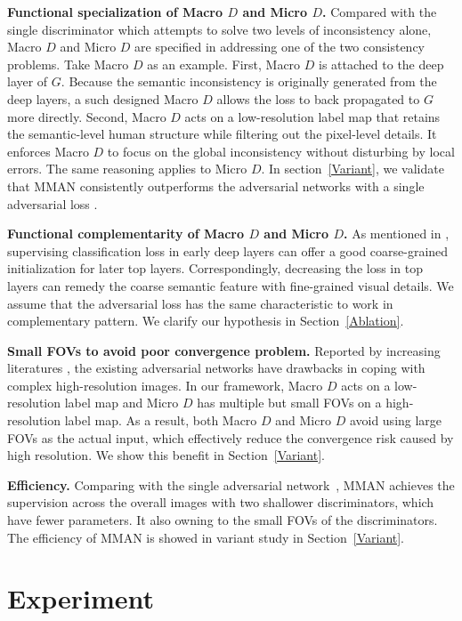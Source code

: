 \documentclass[runningheads]{llncs}
\begin{document}
\textbf{Functional specialization of Macro $D$ and Micro $D$.} Compared with the single discriminator which attempts to solve two levels of inconsistency alone, Macro $D$ and Micro $D$ are specified in addressing one of the two consistency problems. Take Macro $D$ as an example. First, Macro $D$ is attached to the deep layer of $G$. Because the semantic inconsistency is originally generated from the deep layers, a such designed Macro $D$ allows the loss to back propagated to $G$ more directly. Second, Macro $D$ acts on a low-resolution label map that retains the semantic-level human structure while filtering out the pixel-level details. It enforces Macro $D$ to focus on the global inconsistency without disturbing by local errors. The same reasoning applies to Micro $D$. In section~\ref{Variant}, we validate that MMAN consistently outperforms the adversarial networks with a single adversarial loss \cite{luc2016semantic,dai2017scan}.

\textbf{Functional complementarity of Macro $D$ and Micro $D$.} As mentioned in \cite{xue2017segan}, supervising classification loss in early deep layers can offer a good coarse-grained initialization for later top layers. Correspondingly, decreasing the loss in top layers can remedy the coarse semantic feature with fine-grained visual details. We assume that the adversarial loss has the same characteristic to work in complementary pattern. We clarify our hypothesis in Section~\ref{Ablation}.

\textbf{Small FOVs to avoid poor convergence problem.} Reported by increasing literatures \cite{denton2015pyramid,karras2017progressive}, the existing adversarial networks have drawbacks in coping with complex high-resolution images. In our framework, Macro $D$ acts on a low-resolution label map and Micro $D$ has multiple but small FOVs on a high-resolution label map. As a result, both Macro $D$ and Micro $D$ avoid using large FOVs as the actual input, which effectively reduce the convergence risk caused by high resolution. We show this benefit in Section~\ref{Variant}.

\textbf{Efficiency.} Comparing with the single adversarial network~\cite{luc2016semantic,dai2017scan}, MMAN achieves the supervision across the overall images with two shallower discriminators, which have fewer parameters. It also owning to the small FOVs of the discriminators. The efficiency of MMAN is showed in variant study in Section~\ref{Variant}.


\section{Experiment}
\end{document}
